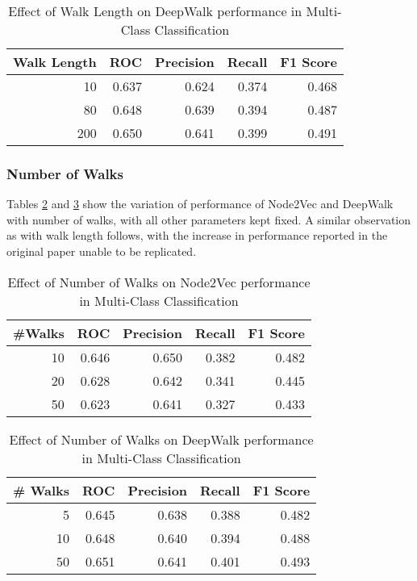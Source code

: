 \documentclass[sigconf]{acmart}
\begin{document}
\begin{table}[H]
\begin{tabular}{|r|r|r|r|r|}
\hline
\textbf{Walk Length} & \textbf{ROC} & \textbf{Precision} & \textbf{Recall} & \textbf{F1 Score}\\
\hline
10 & 0.637 & 0.624 & 0.374 & 0.468\\
80 & 0.648 & 0.639 & 0.394 & 0.487\\
200 & 0.650 & 0.641 & 0.399 & 0.491\\
\hline
\end{tabular}
\caption{Effect of Walk Length on DeepWalk performance in Multi-Class Classification}

\label{tab:walk_length_dw}
\end{table}

\subsubsection{Number of Walks}
Tables \ref{tab:nwalk_n2v} and 
\ref{tab:nwalk_dw} show the variation of performance of Node2Vec and DeepWalk with number of walks, with all other parameters kept fixed. A similar observation as with walk length follows, with the increase in performance reported in the original paper unable to be replicated.
\begin{table}[H]
\begin{tabular}{|r|r|r|r|r|}
\hline
\textbf{\#Walks} & \textbf{ROC} & \textbf{Precision} & \textbf{Recall} & \textbf{F1 Score}\\
\hline
10 & 0.646 & 0.650 & 0.382 & 0.482\\
20 & 0.628 & 0.642 & 0.341 & 0.445\\
50 & 0.623 & 0.641 & 0.327 & 0.433\\
\hline
\end{tabular}
\caption{Effect of Number of Walks on Node2Vec performance in Multi-Class Classification}
\label{tab:nwalk_n2v}
\end{table}

\begin{table}[H]
\begin{tabular}{|r|r|r|r|r|}
\hline
\textbf{\# Walks} & \textbf{ROC} & \textbf{Precision} & \textbf{Recall} & \textbf{F1 Score}\\
\hline
5 & 0.645 & 0.638 & 0.388 & 0.482\\
10 & 0.648 & 0.640 & 0.394 & 0.488\\
50 & 0.651 & 0.641 & 0.401 & 0.493\\
\hline
\end{tabular}
\caption{Effect of Number of Walks on DeepWalk performance in Multi-Class Classification}
\label{tab:nwalk_dw}
\end{table}
\end{document}

